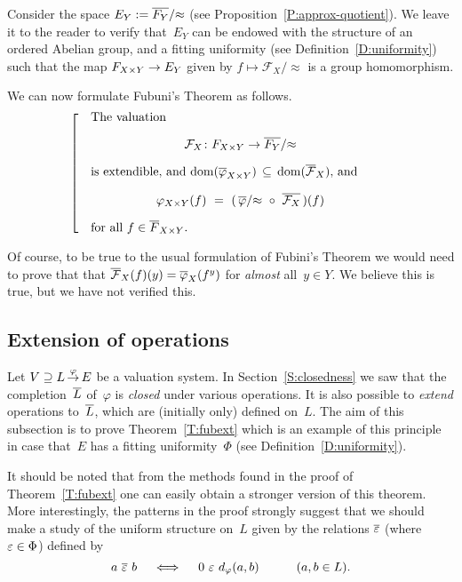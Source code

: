 \documentclass[main.tex]{subfiles}
\begin{document}
Consider the space $E_Y := \overline{F_Y}/{\approx}$
(see Proposition~\ref{P:approx-quotient}).
We leave it to the reader to
verify that~$E_Y$ can be endowed with 
the structure of an ordered Abelian group,
and a fitting uniformity
(see Definition~\ref{D:uniformity})
such that the map $F_{X\times Y} \rightarrow E_Y$
given by $f\mapsto \mathcal{F}_X /\approx$
is a group homomorphism.

We can now formulate Fubuni's Theorem as follows.
\begin{equation}
\label{eq:fub}
\left[\quad
\begin{minipage}{.7\columnwidth}
The valuation 
\begin{equation*}
\mathcal{F}_X\colon F_{X\times Y} \ra \qvL{\ol{F_Y}}
\end{equation*}
is extendible, 
and $\mathrm{dom}(\ol{\varphi}_{X\times Y})
\,\subseteq\, 
 \mathrm{dom}(\ol{\mathcal{F}}_X)$,
and 
\begin{equation*}
\varphi_{X\times Y}(f) \ =\ 
(\,\qvphi{\ol\varphi} \ \circ\  \ol{\mathcal{F}_X} \,)(f)
\end{equation*}
for all $f\in\ol{F}_{X\times Y}$.
\end{minipage}
\right.
\end{equation}

Of course,
to be true to the usual formulation of Fubini's Theorem
we would need to prove that
that $\overline{\mathcal{F}}_X(f)(y) = \overline{\varphi}_X(f^y)$
for \emph{almost} all~$y\in Y$.
We believe this is true,
but we have not verified this.

\subsection{Extension of operations}
\label{SS:fub_part2}
Let $V \supseteq L\,\smash{\stackrel{\varphi}{\rightarrow}}\,E$ be a valuation system.
In Section~\ref{S:closedness}
we saw that the completion~$\overline{L}$ of~$\varphi$ is \emph{closed} under
various operations.
It is also possible to \emph{extend} operations
 to~$\overline{L}$, which are (initially only) defined on~$L$.
The aim of this subsection is to prove Theorem~\ref{T:fubext}
which is an example of this principle
in case that~$E$ has a fitting uniformity~$\Phi$
(see Definition~\ref{D:uniformity}).

It should be noted that from the methods
found in the proof of Theorem~\ref{T:fubext}
one can easily obtain a stronger version of this theorem.
More interestingly,
the patterns in the proof strongly suggest that
we should make a study of the uniform structure on~$L$
given by the relations $\overline{\varepsilon}$ (where $\varepsilon\in\Phi$) defined by
\begin{equation*}
a \ \ol{\ve}\ b \quad\iff\quad 0\ \ve\ \ld\varphi(a,b)\qquad\quad(a,b\in L).
\end{equation*}
\end{document}
